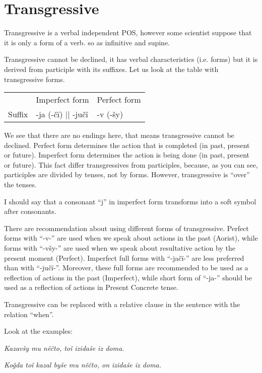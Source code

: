 \section{Transgressive}

Transgressive is a verbal independent POS, however some scientist suppose that it is only a form of a verb. so as infinitive and supine.

Transgressive cannot be declined, it has verbal characteristics (i.e. forms) but it is derived from participle with its suffixes. Let us look at the table with transgressive forms.

\begin{table}
	\begin{tabular}{lll}
		& Imperfect form & Perfect form \\
		Suffix & -ja (-čï) || -jučï & -v (-šy)
	\end{tabular}
\end{table}

We see that there are no endings here, that means transgressive cannot be declined. Perfect form determines the action that is completed (in past, present or future). Imperfect form determines the action is being done (in past, present or future). This fact differ transgressives from participles, because, as you can see, participles are divided by tenses, not by forms. However, transgressive is “over” the tenses. 

I should say that a consonant “j” in imperfect form transforms into a soft symbol after consonants. 

There are recommendation about using different forms of transgressive. Perfect forms with “-v-” are used when we speak about actions in the past (Aorist), while forms with “-všy-” are used when we speak about resultative action by the present moment (Perfect). Imperfect full forms with “-jačï-” are less preferred than with “-jučï-”. Moreover, these full forms are recommended to be used as a reflection of actions in the past (Imperfect), while short form of “-ja-” should be used as a reflection of actions in Present Concrete tense.

Transgressive can be replaced with a relative clause in the sentence with the relation “when”.

Look at the examples:

\textit{Kazavšy mu něčto, toǐ izidaše iz doma.}

\textit{Koĝda toǐ kazal byše mu něčto, on izidaše iz doma.}
